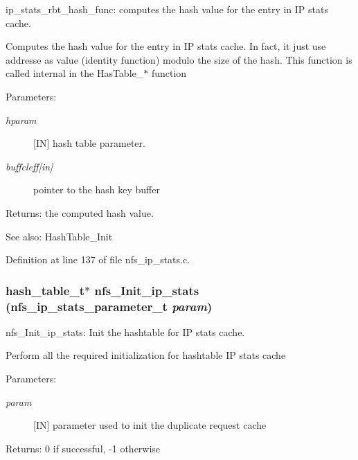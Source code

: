 ip\_\-stats\_\-rbt\_\-hash\_\-func: computes the hash value for the entry in IP stats cache.

Computes the hash value for the entry in IP stats cache. In fact, it just use addresse as value (identity function) modulo the size of the hash. This function is called internal in the Has\-Table\_\-$\ast$ function

\begin{Desc}
\item[Parameters:]
\begin{description}
\item[{\em hparam}][IN] hash table parameter. \item[{\em buffcleff\mbox{[}in\mbox{]}}]pointer to the hash key buffer\end{description}
\end{Desc}
\begin{Desc}
\item[Returns:]the computed hash value.\end{Desc}
\begin{Desc}
\item[See also:]Hash\-Table\_\-Init \end{Desc}


Definition at line 137 of file nfs\_\-ip\_\-stats.c.
\subsubsection{\setlength{\rightskip}{0pt plus 5cm}hash\_\-table\_\-t$\ast$ nfs\_\-Init\_\-ip\_\-stats (nfs\_\-ip\_\-stats\_\-parameter\_\-t {\em param})}\label{nfs__ip__stats_8c_a10}


nfs\_\-Init\_\-ip\_\-stats: Init the hashtable for IP stats cache.

Perform all the required initialization for hashtable IP stats cache

\begin{Desc}
\item[Parameters:]
\begin{description}
\item[{\em param}][IN] parameter used to init the duplicate request cache\end{description}
\end{Desc}
\begin{Desc}
\item[Returns:]0 if successful, -1 otherwise \end{Desc}



